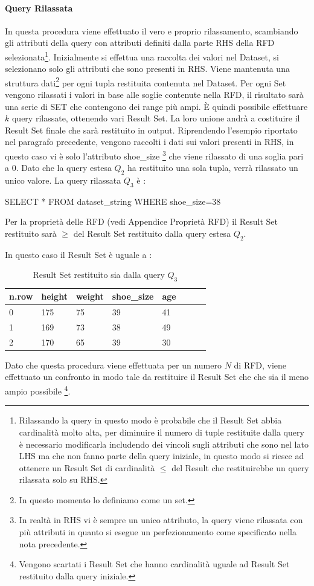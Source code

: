 \paragraph{Query Rilassata}
In questa procedura viene effettuato il vero e proprio rilassamento, scambiando gli attributi della query con attributi definiti dalla parte RHS della RFD selezionata\footnote{Rilassando la query in questo modo è probabile che il Result Set abbia cardinalità molto alta, per diminuire il numero di tuple restituite dalla query è necessario modificarla includendo dei vincoli sugli attributi che sono nel lato LHS ma che non fanno parte della query iniziale, in questo modo si riesce ad ottenere un Result Set di cardinalità $\leq$ del Result che restituirebbe un query rilassata solo su RHS.}.
Inizialmente si effettua una raccolta dei valori nel Dataset, si selezionano solo gli attributi che sono presenti in RHS. Viene mantenuta una struttura dati\footnote{In questo momento lo definiamo come un set.} per ogni tupla restituita contenuta nel Dataset. 
Per ogni Set vengono rilassati i valori in base alle soglie contenute nella RFD, il risultato sarà una serie di SET che contengono dei range più ampi.
È quindi possibile effettuare $k$ query rilassate, ottenendo vari Result Set. La loro unione andrà a costituire il Result Set finale che sarà restituito in output.
Riprendendo l'esempio riportato nel paragrafo precedente, vengono raccolti i dati sui valori presenti in RHS, in questo caso vi è solo l'attributo shoe{\_}size \footnote{In realtà in RHS vi è sempre un unico attributo, la query viene rilassata con più attributi in quanto si esegue un perfezionamento come specificato nella nota precedente.} che viene rilassato di una soglia pari a 0. Dato che la query estesa $Q_2$ ha restituito una sola tupla, verrà rilassato un unico valore. La query rilassata $Q_3$  è : \newline 
\centerline{SELECT * FROM dataset{\_}string WHERE shoe{\_}size=38}
\newline
Per la proprietà delle RFD (vedi Appendice Proprietà RFD) il Result Set restituito sarà $\geq$ del Result Set restituito dalla query estesa $Q_2$.

In questo caso il Result Set è uguale a :
\begin{table}[H]
    \centering
    \begin{tabular}{l l l l l l l l}
    n.row  & height & weight & shoe{\_}size & age \\
    \hline
    0  & 175 & 75 & 39 & 41 \\
    1  & 169 & 73 & 38 & 49 \\
    2  & 170 & 65 & 39 & 30 \\
    \end{tabular}
    \caption{Result Set restituito sia dalla query $Q_3$ }
    \label{tab:relax_result_set}
\end{table}

Dato che questa procedura viene effettuata per un numero $N$ di RFD, viene effettuato un confronto in modo tale da restituire il Result Set che che sia il meno ampio possibile \footnote{Vengono scartati i Result Set che hanno cardinalità uguale ad Result Set restituito dalla query iniziale.}.


